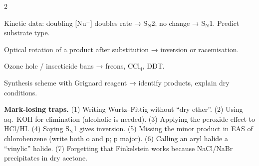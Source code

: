 \documentclass[10pt,a4paper]{extarticle}
\begin{document}
\begin{multicols}{2}
\begin{fl}
\item Kinetic data: doubling [Nu$^-$] doubles rate → S$_\text{N}$2; no change → S$_\text{N}$1. Predict substrate type.
\item Optical rotation of a product after substitution → inversion or racemisation.
\item Ozone hole / insecticide bans → freons, CCl$_4$, DDT.
\item Synthesis scheme with Grignard reagent → identify products, explain dry conditions.
\end{fl}

\begin{tip}\Tip \textbf{Mark-losing traps.} (1) Writing Wurtz--Fittig without ``dry ether''. (2) Using aq.\ KOH for elimination (alcoholic is needed). (3) Applying the peroxide effect to HCl/HI. (4) Saying S$_\text{N}$1 gives inversion. (5) Missing the minor product in EAS of chlorobenzene (write both o and p; p major). (6) Calling an aryl halide a ``vinylic'' halide. (7) Forgetting that Finkelstein works because NaCl/NaBr precipitates in dry acetone.\end{tip}
\end{multicols}
\begin{tcolorbox}[enhanced,colback=white,colframe=uc,boxrule=0.6pt,arc=2pt,title={\sffamily\bfseries\footnotesize My notes — Ch 6},colbacktitle=uc,coltitle=white,height fill,before skip=4pt]
\end{tcolorbox}
\end{document}

